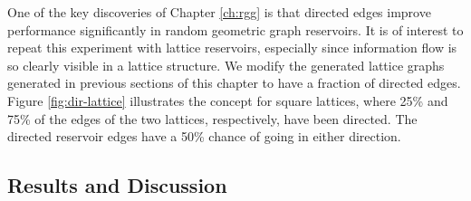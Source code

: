 One of the key discoveries of Chapter \ref{ch:rgg} is that directed edges
improve performance significantly in random geometric graph reservoirs. It is of
interest to repeat this experiment with lattice reservoirs, especially since
information flow is so clearly visible in a lattice structure. We modify the
generated lattice graphs generated in previous sections of this chapter to have
a fraction of directed edges. Figure \ref{fig:dir-lattice} illustrates the
concept for square lattices, where 25\% and 75\% of the edges of the two
lattices, respectively, have been directed. The directed reservoir edges have a
50\% chance of going in either direction.

\subsection{Results and Discussion}


